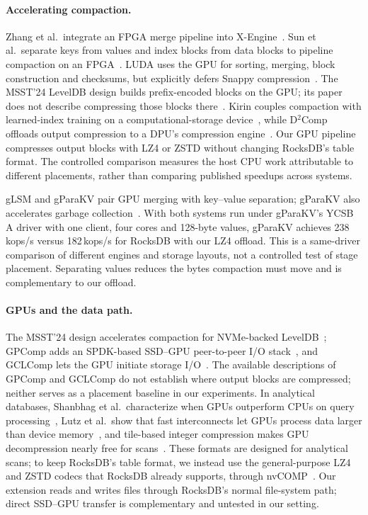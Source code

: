\documentclass[sigconf, nonacm]{acmart}
\begin{document}
\paragraph{Accelerating compaction.}
Zhang et al.\ integrate an FPGA merge pipeline into X-Engine~\cite{fpga2020}. Sun
et al.\ separate keys from values and index blocks from data blocks to pipeline
compaction on an FPGA~\cite{fpgacompaction2020}. LUDA uses the GPU for sorting, merging,
block construction and checksums, but explicitly defers Snappy compression~\cite{luda2020}.
The MSST'24 LevelDB design builds prefix-encoded blocks on the GPU; its paper does not
describe compressing those blocks there~\cite{zhou2024msst}. Kirin couples compaction with
learned-index training on a computational-storage device~\cite{kirin2026}, while D$^2$Comp
offloads output compression to a DPU's compression engine~\cite{d2comp2024}.
Our GPU pipeline compresses output blocks with LZ4 or ZSTD without changing RocksDB's
table format. The controlled comparison measures the host CPU work attributable to
different placements, rather than comparing published speedups across systems.

gLSM and gParaKV pair GPU merging with key--value separation; gParaKV also accelerates
garbage collection~\cite{glsm2024,gparakv2025}. With both systems run under gParaKV's
YCSB A driver with one client, four cores and 128-byte values, gParaKV achieves
238\,kops/s versus 182\,kops/s for RocksDB with our LZ4 offload. This is a same-driver
comparison of different engines and storage layouts, not a controlled test of stage
placement. Separating values reduces the bytes compaction must move and is complementary
to our offload.

\paragraph{GPUs and the data path.}
The MSST'24 design accelerates compaction for NVMe-backed LevelDB~\cite{zhou2024msst};
GPComp adds an SPDK-based SSD--GPU peer-to-peer I/O stack~\cite{gpcomp2025}, and GCLComp
lets the GPU initiate storage I/O~\cite{gclcomp2025}. The available descriptions of
GPComp and GCLComp do not establish where output blocks are compressed; neither
serves as a placement baseline in our experiments.
In analytical databases, Shanbhag et al.\ characterize when GPUs outperform CPUs on query
processing~\cite{crystal2020}, Lutz et al.\ show that fast interconnects let GPUs process
data larger than device memory~\cite{pumpvolume2020}, and tile-based integer compression
makes GPU decompression nearly free for scans~\cite{tilegpu2022}. These formats are designed
for analytical scans; to keep RocksDB's table format, we instead use the general-purpose LZ4
and ZSTD codecs that RocksDB already supports, through nvCOMP~\cite{nvcomp}. Our extension reads and writes files through
RocksDB's normal file-system path; direct SSD--GPU transfer is complementary and untested
in our setting.
\end{document}
